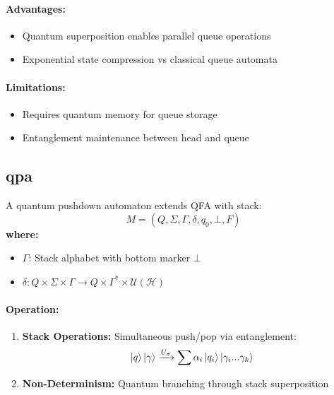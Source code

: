 \paragraph{Advantages:}
\begin{itemize}
    \item Quantum superposition enables parallel queue operations
    \item Exponential state compression vs classical queue automata
\end{itemize}

\paragraph{Limitations:}
\begin{itemize}
    \item Requires quantum memory for queue storage
    \item Entanglement maintenance between head and queue
\end{itemize}

\subsection{\acrfull{qpa}}
\label{subsec:qpa}

\begin{definition}
A quantum pushdown automaton extends QFA with stack:
\[
M = (Q, \Sigma, \Gamma, \delta, q_0, \bot, F)
\]
\textbf{where:}
\begin{itemize}
    \item $\Gamma$: Stack alphabet with bottom marker $\bot$
    \item $\delta: Q \times \Sigma \times \Gamma \rightarrow Q \times \Gamma^* \times \mathcal{U}(\mathcal{H})$
\end{itemize}
\end{definition}

\paragraph{Operation:}
\begin{enumerate}
    \item \textbf{Stack Operations:} Simultaneous push/pop via entanglement:
    \[
    \ket{q}\ket{\gamma} \xrightarrow{U_\sigma} \sum \alpha_i \ket{q_i}\ket{\gamma_i...\gamma_k}
    \]
    \item \textbf{Non-Determinism:} Quantum branching through stack superposition
\end{enumerate}


